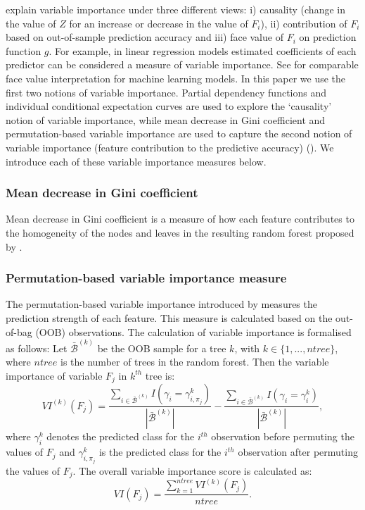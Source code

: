 \documentclass[11pt,a4paper,]{article}
\begin{document}
\textcite{jiang2002} explain variable importance under three different views: i) causality (change in the value of \(Z\) for an increase or decrease in the value of \(F_i\)), ii) contribution of \(F_i\) based on out-of-sample prediction accuracy and iii) face value of \(F_i\) on prediction function \(g\). For example, in linear regression models estimated coefficients of each predictor can be considered a measure of variable importance. See \textcite{jiang2002} for comparable face value interpretation for machine learning models. In this paper we use the first two notions of variable importance. Partial dependency functions and individual conditional expectation curves are used to explore the `causality' notion of variable importance, while mean decrease in Gini coefficient and permutation-based variable importance are used to capture the second notion of variable importance (feature contribution to the predictive accuracy) (\textcite{Zhao}). We introduce each of these variable importance measures below.

\hypertarget{mean-decrease-in-gini-coefficient}{%
\subsubsection{Mean decrease in Gini coefficient}\label{mean-decrease-in-gini-coefficient}}

Mean decrease in Gini coefficient is a measure of how each feature contributes to the homogeneity of the nodes and leaves in the resulting random forest proposed by \textcite{breiman2001random}.

\hypertarget{permutation-based-variable-importance-measure}{%
\subsubsection{Permutation-based variable importance measure}\label{permutation-based-variable-importance-measure}}

The permutation-based variable importance introduced by \textcite{breiman2001random} measures the prediction
strength of each feature. This measure is calculated based on the out-of-bag (OOB) observations. The calculation of variable importance is formalised as follows: Let \(\bar{\mathcal{B}}^{(k)}\) be the OOB sample for a tree \(k\), with \(k\in \{1,...,ntree\}\), where \(ntree\) is the number of trees in the random forest. Then the variable importance of variable \(F_{j}\) in \(k^{th}\) tree is:
\[VI^{(k)}(F_{j})=\frac{\sum_{i\in \bar{\mathcal{B}}^{(k)}}I(\gamma_{i}=\gamma_{i,\pi_{j}}^{k})}{|\bar{\mathcal{B}}^{(k)}|}-\frac{\sum_{i\in \bar{\mathcal{B}}^{(k)}}I(\gamma_{i}=\gamma_{i}^{k})}{|\bar{\mathcal{B}}^{(k)}|},\]
where \(\gamma_{i}^{k}\) denotes the predicted class for the \(i^{th}\) observation before permuting the values of \(F_{j}\) and \(\gamma_{i, \pi_{j}}^{k}\) is the predicted class for the \(i^{th}\) observation after permuting the values of \(F_{j}\). The overall variable importance score is calculated as:
\[VI(F_{j})=\frac{\sum_{k=1}^{ntree}VI^{(k)}(F_{j})}{ntree}.\]
\end{document}
